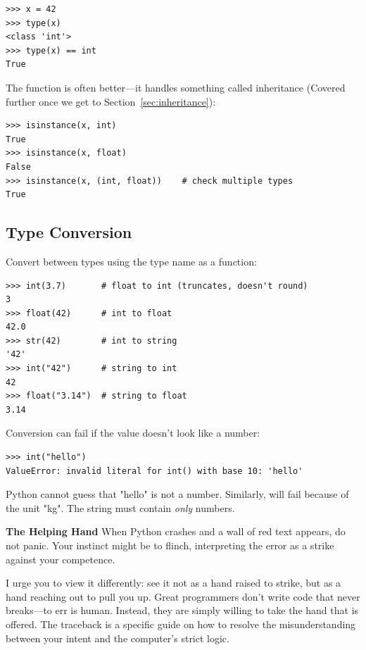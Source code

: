 \begin{lstlisting}
>>> x = 42
>>> type(x)
<class 'int'>
>>> type(x) == int
True
\end{lstlisting}

The  function is often better---it handles something called inheritance (Covered further once we get to Section~\ref{sec:inheritance}):

\begin{lstlisting}
>>> isinstance(x, int)
True
>>> isinstance(x, float)
False
>>> isinstance(x, (int, float))    # check multiple types
True
\end{lstlisting}

\subsection{Type Conversion}

Convert between types using the type name as a function:

\begin{lstlisting}
>>> int(3.7)       # float to int (truncates, doesn't round)
3
>>> float(42)      # int to float
42.0
>>> str(42)        # int to string
'42'
>>> int("42")      # string to int
42
>>> float("3.14")  # string to float
3.14
\end{lstlisting}

\begin{warning}
Conversion can fail if the value doesn't look like a number:
\begin{lstlisting}
>>> int("hello")
ValueError: invalid literal for int() with base 10: 'hello'
\end{lstlisting}
Python cannot guess that "hello" is not a number. Similarly,  will fail because of the unit "kg". The string must contain \emph{only} numbers.
\end{warning}


\begin{tip}
\textbf{The Helping Hand}
When Python crashes and a wall of red text appears, do not panic. Your instinct might be to flinch, interpreting the error as a strike against your competence.

I urge you to view it differently: see it not as a hand raised to strike, but as a hand reaching out to pull you up. Great programmers don't write code that never breaks---to err is human. Instead, they are simply willing to take the hand that is offered. The traceback is a specific guide on how to resolve the misunderstanding between your intent and the computer's strict logic.
\end{tip}

